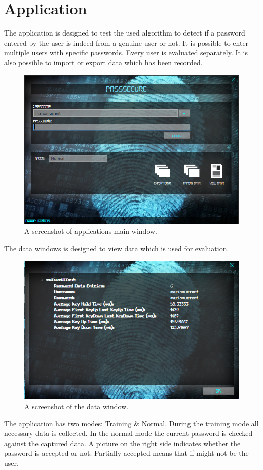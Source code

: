 \documentclass[fleqn,10pt]{SelfArx} %
\begin{document}
\section{Application}
The application is designed to test the used algorithm to detect if a password entered by the user is indeed from a genuine user or not. It is possible to enter multiple users with specific passwords. Every user is evaluated separately. It is also possible to import or export data which has been recorded.
\begin{figure}[!htb]
\includegraphics[scale=0.5]{application}
 \caption{A screenshot of applications main window.}
\end{figure}
The data windows is designed to view data which is used for evaluation.
\begin{figure}[!htb]
\includegraphics[scale=0.6]{viewData}
 \caption{A screenshot of the data window.}
\end{figure}
The application has two modes: Training \& Normal. During the training mode all necessary data is collected. In the normal mode the current password is checked against the captured data. A picture on the right side indicates whether the password is accepted or not. Partially accepted means that if might not be the user.



\end{document}

